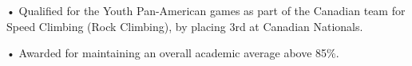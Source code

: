 \documentclass[]{resume}
\begin{document}
\begin{minipage}[t]{0.66\textwidth}
 
\descript{}
\noindent
\hspace{3em}%
\begin{minipage}{0.85\textwidth\vspace{2pt}}
• Qualified for the Youth Pan-American games as part of the Canadian team for Speed Climbing (Rock Climbing), by placing 3rd at Canadian Nationals. 
\end{minipage}
\sectionsep

 
\descript{}
\noindent
\hspace{3em}%
\begin{minipage}{0.85\textwidth\vspace{2pt}}
• Awarded for maintaining an overall academic average above 85\%.
\end{minipage}
\end{minipage} 
\end{document}
